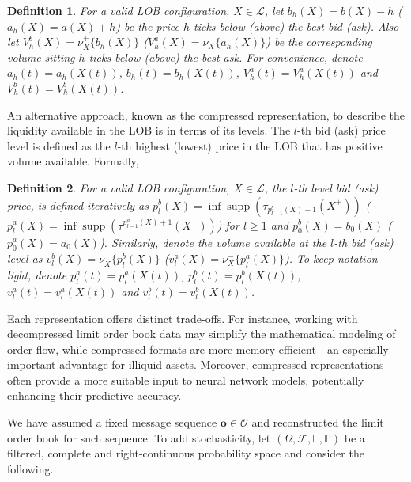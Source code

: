 \documentclass[10pt,a4paper,oneside]{article}
\newcommand{\Prob}{\mathbb{P}}
\newcommand{\Fil}{\mathbb{F}}
\newcommand{\SigAl}{\mathcal{F}}
\newtheorem{definition}{Definition}
\DeclareMathOperator{\support}{supp}
\begin{document}
\begin{definition}
    For a valid LOB configuration, $X \in \mathcal{L}$, let $b_h(X) = b(X) - h$ ($a_h(X) = a(X) + h$) be the price $h$ ticks below (above) the best bid (ask).
     Also let $V^b_h(X) = \nu^+_{X}\{b_{h}(X)\}$ ($V^a_h(X) = \nu^-_{X}\{a_{h}(X)\}$) be the corresponding volume sitting $h$ ticks below (above) the best ask. For convenience, denote $a_h(t) = a_h(X(t))$, $b_h(t) = b_h(X(t))$, $V^a_h(t) = V^a_h(X(t))$ and $V^b_h(t) = V^b_h(X(t))$.
     \label{def:bid_ask_volume_dephts}
\end{definition}

An alternative approach, known as the compressed representation, to describe the liquidity available in the LOB is in terms of its levels. The $l$-th bid (ask) price level is defined as the $l$-th highest (lowest) price in the LOB that has positive volume available. Formally, 

\begin{definition}
    For a valid LOB configuration, $X \in \mathcal{L}$, the $l$-th level bid (ask) price, is defined iteratively as $p^b_l(X) = \inf \support\left(\tau_{p^b_{l - 1}(X) - 1}(X^+) \right)$ ($p^a_l(X) = \inf \support\left(\tau^{p^a_{l - 1}(X) + 1}(X^-) \right)$) for $l \geq 1$ and $p^b_0(X) = b_0(X)$ ($p^a_0(X) = a_0(X)$). Similarly, denote the volume available at the $l$-th bid (ask) level as $v^b_l(X) = \nu^+_{X}\{p^b_l(X)\}$ ($v^a_l(X) = \nu^-_{X}\{p^a_l(X)\}$). To keep notation light, denote $p^a_l(t) = p^a_l(X(t))$, $p^b_l(t) = p^b_l(X(t))$, $v^a_l(t) = v^a_l(X(t))$ and $v^b_l(t) = v^b_l(X(t))$.
    \label{def:bid_ask_volume_levels}
\end{definition}

Each representation offers distinct trade-offs. For instance, working with decompressed limit order book data may simplify the mathematical modeling of order flow, while compressed formats are more memory-efficient—an especially important advantage for illiquid assets. Moreover, compressed representations often provide a more suitable input to neural network models, potentially enhancing their predictive accuracy.


We have assumed a fixed message sequence $\mathbf{o} \in \mathcal{O}$ and reconstructed the limit order book for such sequence. To add stochasticity, let $(\Omega, \SigAl, \Fil, \Prob)$ be a filtered, complete and right-continuous probability space and consider the following.
\end{document}
